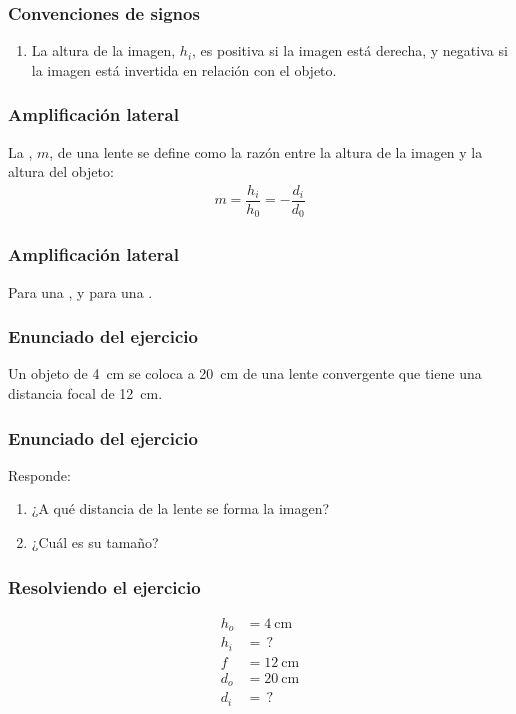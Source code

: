 \documentclass[14pt]{beamer}
\begin{document}
\begin{frame}
\frametitle{Convenciones de signos}
\begin{enumerate}[<+->]
\conti
\item La altura de la imagen, $h_{i}$, es positiva si la imagen está derecha, y negativa si la imagen está invertida en relación con el objeto.
\end{enumerate}
\end{frame}
\begin{frame}
\frametitle{Amplificación lateral}
La , $m$, de una lente se define como la razón entre la altura de
la imagen y la altura del objeto:
\pause
\begin{align*}
m = \dfrac{h_{i}}{h_{0}} = - \dfrac{d_{i}}{d_{0}}
\end{align*}
\end{frame}
\begin{frame}
\frametitle{Amplificación lateral}
Para una , \pause y para una .
\end{frame}
\begin{frame}
\frametitle{Enunciado del ejercicio}
Un objeto de \SI{4}{\centi\meter} se coloca a \SI{20}{\centi\meter} de una lente convergente que tiene una distancia focal de \SI{12}{\centi\meter}.
\end{frame}
\begin{frame}
\frametitle{Enunciado del ejercicio}
Responde:
\begin{enumerate}[<+->]
\item ¿A qué distancia de la lente se forma la imagen?
\item ¿Cuál es su tamaño?
\end{enumerate}
\end{frame}
\begin{frame}
\frametitle{Resolviendo el ejercicio}
\vspace*{-0.5cm}
\pause
\begin{align*}
h_{o} &= \SI{4}{\centi\meter} \\
h_{i} &= \, ? \\
f &= \SI{12}{\centi\meter} \\
d_{o} &= \SI{20}{\centi\meter} \\
d_{i} &= \, ?
\end{align*}
\end{frame}
\end{document}
